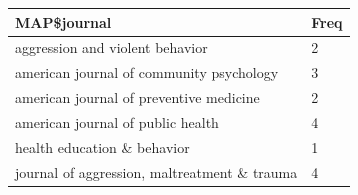 \documentclass[]{tufte-handout}
\begin{document}
\begin{longtable}[]{@{}ll@{}}
\toprule
\begin{minipage}[b]{0.67\columnwidth}\raggedright\strut
MAP\$journal\strut
\end{minipage} & \begin{minipage}[b]{0.08\columnwidth}\raggedright\strut
Freq\strut
\end{minipage}\tabularnewline
\midrule
\endhead
\begin{minipage}[t]{0.67\columnwidth}\raggedright\strut
aggression and violent behavior\strut
\end{minipage} & \begin{minipage}[t]{0.08\columnwidth}\raggedright\strut
2\strut
\end{minipage}\tabularnewline
\begin{minipage}[t]{0.67\columnwidth}\raggedright\strut
american journal of community psychology\strut
\end{minipage} & \begin{minipage}[t]{0.08\columnwidth}\raggedright\strut
3\strut
\end{minipage}\tabularnewline
\begin{minipage}[t]{0.67\columnwidth}\raggedright\strut
american journal of preventive medicine\strut
\end{minipage} & \begin{minipage}[t]{0.08\columnwidth}\raggedright\strut
2\strut
\end{minipage}\tabularnewline
\begin{minipage}[t]{0.67\columnwidth}\raggedright\strut
american journal of public health\strut
\end{minipage} & \begin{minipage}[t]{0.08\columnwidth}\raggedright\strut
4\strut
\end{minipage}\tabularnewline
\begin{minipage}[t]{0.67\columnwidth}\raggedright\strut
health education \& behavior\strut
\end{minipage} & \begin{minipage}[t]{0.08\columnwidth}\raggedright\strut
1\strut
\end{minipage}\tabularnewline
\begin{minipage}[t]{0.67\columnwidth}\raggedright\strut
journal of aggression, maltreatment \& trauma\strut
\end{minipage} & \begin{minipage}[t]{0.08\columnwidth}\raggedright\strut
4\strut
\end{minipage}\tabularnewline

\end{longtable}
\end{document}
